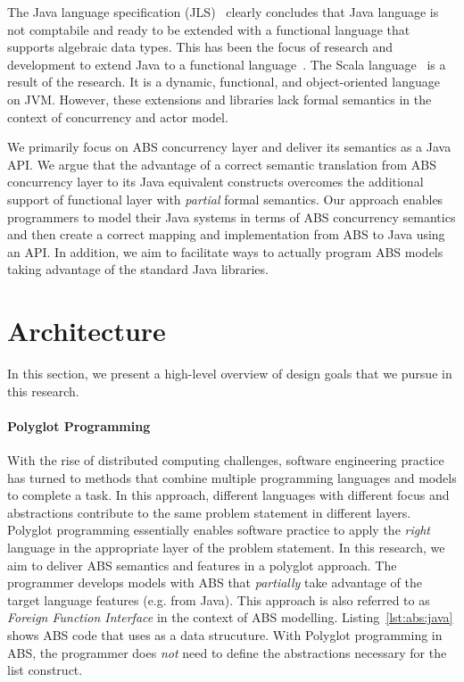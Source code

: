 The Java language specification (JLS)~\cite{gosling2000java} clearly concludes that Java language is not comptabile and ready to be extended with a functional language that supports algebraic data types.
This has been the focus of research and development to extend Java to a functional language~\cite{odersky1997pizza,henkel2003discovering,nystrom2003polyglot,bracha1998making}.
The Scala language~\cite{odersky2004scala} is a result of the research. It is a dynamic, functional, and object-oriented language on JVM.
However, these extensions and libraries lack formal semantics in the context
of concurrency and actor model.

We primarily focus on ABS concurrency layer and deliver its semantics as a Java API.
We argue that the advantage of a correct semantic translation from ABS concurrency layer to its Java equivalent constructs overcomes the additional support of functional layer with \emph{partial} formal semantics.
Our approach enables programmers to model their Java systems in terms of ABS concurrency semantics and then create a correct mapping and implementation from ABS to Java using an API.
In addition, we aim to facilitate ways to actually program ABS models taking advantage of the standard Java libraries.

\section{Architecture}
\label{sec:intro:arch:crit}

In this section, we present a high-level overview of design goals that we pursue in this research. 

\paragraph{Polyglot Programming}
With the rise of distributed computing challenges, software engineering practice has turned to methods that combine multiple programming languages and models to complete a task. 
In this approach, different languages with different focus and abstractions contribute to the same problem statement in different layers. 
Polyglot programming essentially enables software practice to apply the \emph{right} language in the appropriate layer of the problem statement. 
In this research, we aim to deliver ABS semantics and features in a polyglot approach. 
The programmer develops models with ABS that \emph{partially} take advantage of the target language features (e.g. from Java).
This approach is also referred to as \emph{Foreign Function Interface} in the context of ABS modelling.
Listing~\ref{lst:abs:java} shows ABS code that uses  as a data strucuture.
With Polyglot programming in ABS, the programmer does \emph{not} need to define the abstractions necessary for the list construct. 

